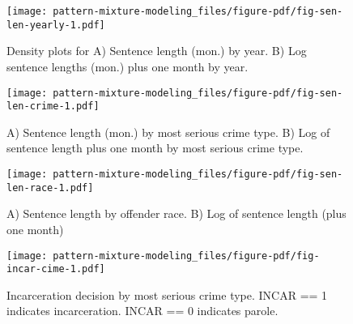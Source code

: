 \documentclass[
  letterpaper,
  DIV=11,
  numbers=noendperiod]{scrartcl}
\begin{document}
\begin{figure}

{\centering \texttt{[image: pattern-mixture-modeling\_files/figure-pdf/fig-sen-len-yearly-1.pdf]}

}

\caption{\label{fig-sen-len-yearly}Density plots for A) Sentence length
(mon.) by year. B) Log sentence lengths (mon.) plus one month by year.}

\end{figure}

\begin{figure}

{\centering \texttt{[image: pattern-mixture-modeling\_files/figure-pdf/fig-sen-len-crime-1.pdf]}

}

\caption{\label{fig-sen-len-crime}A) Sentence length (mon.) by most
serious crime type. B) Log of sentence length plus one month by most
serious crime type.}

\end{figure}

\begin{figure}

{\centering \texttt{[image: pattern-mixture-modeling\_files/figure-pdf/fig-sen-len-race-1.pdf]}

}

\caption{\label{fig-sen-len-race}A) Sentence length by offender race. B)
Log of sentence length (plus one month)}

\end{figure}

\begin{figure}

{\centering \texttt{[image: pattern-mixture-modeling\_files/figure-pdf/fig-incar-cime-1.pdf]}

}

\caption{\label{fig-incar-cime}Incarceration decision by most serious
crime type. INCAR == 1 indicates incarceration. INCAR == 0 indicates
parole.}

\end{figure}
\end{document}
